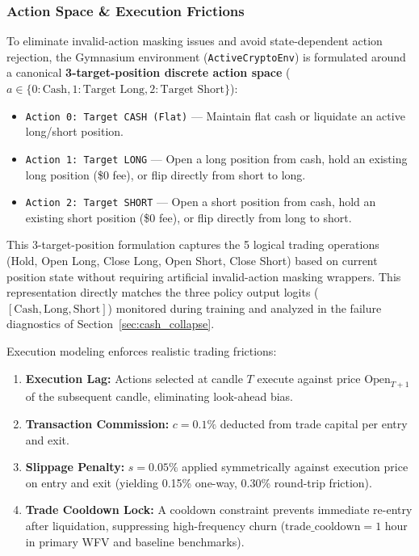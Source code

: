 \documentclass[11pt,a4paper]{article}
\begin{document}
\subsubsection{Action Space \& Execution Frictions}
To eliminate invalid-action masking issues and avoid state-dependent action rejection, the Gymnasium environment (\texttt{ActiveCryptoEnv}) is formulated around a canonical \textbf{3-target-position discrete action space} ($a \in \{0: \text{Cash}, 1: \text{Target Long}, 2: \text{Target Short}\}$):
\begin{itemize}[leftmargin=2em]
    \item \texttt{Action 0: Target CASH (Flat)} --- Maintain flat cash or liquidate an active long/short position.
    \item \texttt{Action 1: Target LONG} --- Open a long position from cash, hold an existing long position (\$0 fee), or flip directly from short to long.
    \item \texttt{Action 2: Target SHORT} --- Open a short position from cash, hold an existing short position (\$0 fee), or flip directly from long to short.
\end{itemize}

This 3-target-position formulation captures the 5 logical trading operations (Hold, Open Long, Close Long, Open Short, Close Short) based on current position state without requiring artificial invalid-action masking wrappers. This representation directly matches the three policy output logits ($[\text{Cash}, \text{Long}, \text{Short}]$) monitored during training and analyzed in the failure diagnostics of Section~\ref{sec:cash_collapse}.

Execution modeling enforces realistic trading frictions:
\begin{enumerate}[leftmargin=2em]
    \item \textbf{Execution Lag:} Actions selected at candle $T$ execute against price $\text{Open}_{T+1}$ of the subsequent candle, eliminating look-ahead bias.
    \item \textbf{Transaction Commission:} $c = 0.1\%$ deducted from trade capital per entry and exit.
    \item \textbf{Slippage Penalty:} $s = 0.05\%$ applied symmetrically against execution price on entry and exit (yielding 0.15\% one-way, 0.30\% round-trip friction).
    \item \textbf{Trade Cooldown Lock:} A cooldown constraint prevents immediate re-entry after liquidation, suppressing high-frequency churn ($\text{trade\_cooldown} = 1$ hour in primary WFV and baseline benchmarks).
\end{enumerate}
\end{document}
